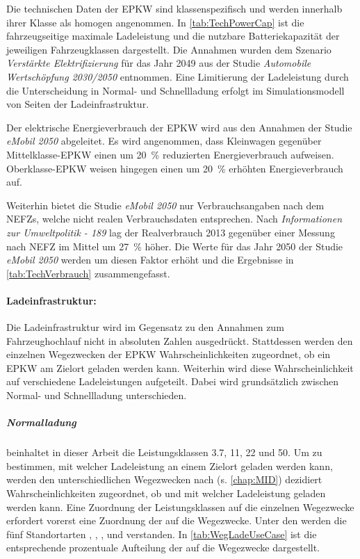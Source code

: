 Die technischen Daten der \gls{EPKW} sind klassenspezifisch und werden innerhalb ihrer Klasse als homogen angenommen.
In \autoref{tab:TechPowerCap} ist die fahrzeugseitige maximale Ladeleistung und die nutzbare Batteriekapazität der jeweiligen Fahrzeugklassen dargestellt.
Die Annahmen wurden dem Szenario \textit{Verstärkte Elektrifizierung} für das Jahr \num{2049} aus der Studie \textit{Automobile Wertschöpfung 2030/2050} \cite{Kaul2019} entnommen.
Eine Limitierung der Ladeleistung durch die Unterscheidung in Normal- und Schnellladung erfolgt im Simulationsmodell von Seiten der Ladeinfrastruktur.



Der elektrische Energieverbrauch der \gls{EPKW} wird aus den Annahmen der Studie \textit{eMobil 2050} \cite{Hacker2014} abgeleitet.
Es wird angenommen, dass Kleinwagen gegenüber Mittelklasse-\gls{EPKW} einen um \SI{20}{\percent} reduzierten Energieverbrauch aufweisen.
Oberklasse-\gls{EPKW} weisen hingegen einen um \SI{20}{\percent} erhöhten Energieverbrauch auf.\medskip

Weiterhin bietet die Studie \textit{eMobil 2050} nur Verbrauchsangaben nach dem \glspl{NEFZ}, welche nicht realen Verbrauchsdaten entsprechen.
Nach \textit{Informationen zur Umweltpolitik - 189} \cite{Heinfellner2015} lag der Realverbrauch \num{2013} gegenüber einer Messung nach \gls{NEFZ} im Mittel um \SI{27}{\percent} höher.
Die Werte für das Jahr \num{2050} der Studie \textit{eMobil 2050} werden um diesen Faktor erhöht und die Ergebnisse in \autoref{tab:TechVerbrauch} zusammengefasst.




\paragraph{Ladeinfrastruktur:}

Die Ladeinfrastruktur wird im Gegensatz zu den Annahmen zum Fahrzeughochlauf nicht in absoluten Zahlen ausgedrückt.
Stattdessen werden den einzelnen Wegezwecken der \gls{EPKW} Wahrscheinlichkeiten zugeordnet, ob ein \gls{EPKW} am Zielort geladen werden kann.
Weiterhin wird diese Wahrscheinlichkeit auf verschiedene Ladeleistungen aufgeteilt.
Dabei wird grundsätzlich zwischen Normal- und Schnellladung unterschieden.


\subparagraph{Normalladung} beinhaltet in dieser Arbeit die Leistungsklassen \SI{3.7}{\kw}, \SI{11}{\kw}, \SI{22}{\kw} und \SI{50}{\kw}.
Um zu bestimmen, mit welcher Ladeleistung an einem Zielort geladen werden kann, werden den unterschiedlichen Wegezwecken nach  (s. \autoref{chap:MID}) dezidiert Wahrscheinlichkeiten zugeordnet, ob und mit welcher Ladeleistung geladen werden kann.
Eine Zuordnung der Leistungsklassen auf die einzelnen Wegezwecke erfordert vorerst eine Zuordnung der \UCs auf die Wegezwecke.
Unter den \UCs werden die fünf Standortarten \Eigenheimdot, \Wohnanlagedot, \Firmeparkplatzdot, \Gewerbeparkplatz und \Straszenrand verstanden.
In \autoref{tab:WegLadeUseCase} ist die entsprechende prozentuale Aufteilung der \UCs auf die Wegezwecke dargestellt.

